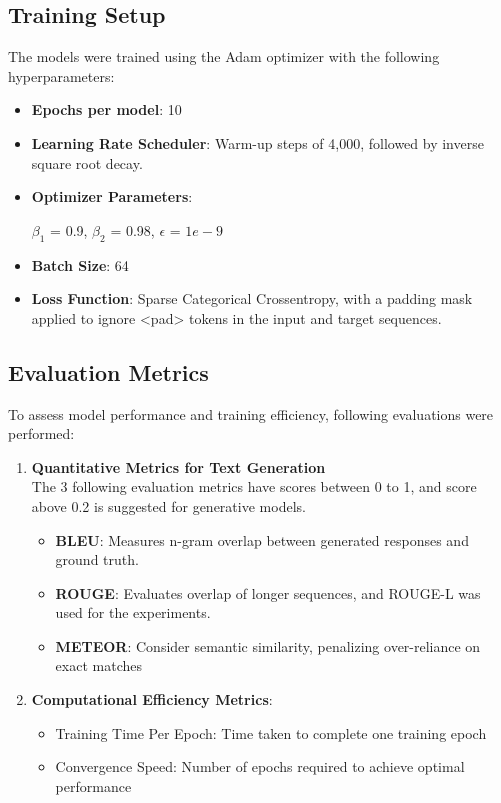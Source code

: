 \documentclass[11pt]{article}
\begin{document}
\subsection{Training Setup}
The models were trained using the Adam optimizer with the following hyperparameters:
    \begin{itemize}
        \item \textbf{Epochs per model}: 10
        \item \textbf{Learning Rate Scheduler}: Warm-up steps of 4,000, followed by inverse square root decay.
        \item \textbf{Optimizer Parameters}:
            \begin{center}
                $\beta_1$ = 0.9, $\beta_2$ = 0.98, $\epsilon$ = $1e-9$
            \end{center}
        \item \textbf{Batch Size}: 64
        \item \textbf{Loss Function}: Sparse Categorical Crossentropy, with a padding mask applied to ignore <pad> tokens in the input and target sequences.
    \end{itemize}
    
\subsection{Evaluation Metrics}
To assess model performance and training efficiency, following evaluations were performed:
    \begin{enumerate}
        \item \textbf{Quantitative Metrics for Text Generation}\\   
        The 3 following evaluation metrics have scores between 0 to 1, and score above 0.2 is suggested for generative models.
          \begin{itemize}
            \item \textbf{BLEU}: Measures n-gram overlap between generated responses and ground truth. 
            \item \textbf{ROUGE}: Evaluates overlap of longer sequences, and ROUGE-L was used for the experiments.
            \item \textbf{METEOR}: Consider semantic similarity, penalizing over-reliance on exact matches
        \end{itemize}
        \item \textbf{Computational Efficiency Metrics}:
            \begin{itemize}
                \item Training Time Per Epoch: Time taken to complete one training epoch
                \item Convergence Speed: Number of epochs required to achieve optimal performance
            \end{itemize}
    \end{enumerate}
  
\end{document}
